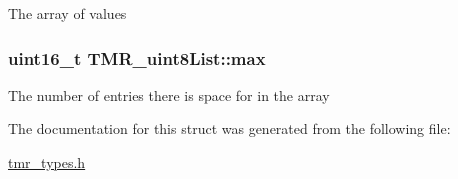 The array of values \hypertarget{struct_t_m_r__uint8_list_8530bb9c74b5dc9ac3d213ff5ab98f7d}{
\subsubsection[{max}]{\setlength{\rightskip}{0pt plus 5cm}uint16\_\-t {\bf TMR\_\-uint8List::max}}}
\label{struct_t_m_r__uint8_list_8530bb9c74b5dc9ac3d213ff5ab98f7d}


The number of entries there is space for in the array 

The documentation for this struct was generated from the following file:\begin{CompactItemize}
\item 
\hyperlink{tmr__types_8h}{tmr\_\-types.h}\end{CompactItemize}

